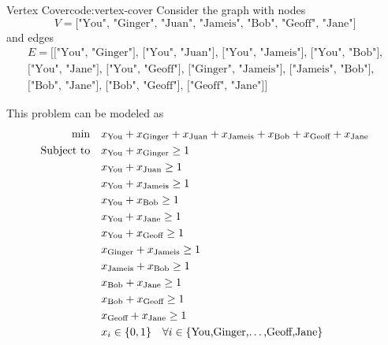 \documentclass[../open-optimization/open-optimization.tex]{subfiles}
\begin{document}
\begin{examplewithcode}{Vertex Cover}{code:vertex-cover}
\label{example:vertex-cover}
Consider the graph with nodes
\begin{equation}
V = \text{["You", "Ginger", "Juan", "Jameis", "Bob", "Geoff", "Jane"]}
\end{equation}
and edges
\begin{align}E = \text{[["You", "Ginger"],
     ["You", "Juan"], 
     ["You", "Jameis"],
     ["You", "Bob"],}\\
     \text{["You", "Jane"],
     ["You", "Geoff"],
     ["Ginger", "Jameis"],
     ["Jameis", "Bob"],}\\
     \text{
     ["Bob", "Jane"],
     ["Bob", "Geoff"],
     ["Geoff", "Jane"]]}
  \end{align}
  
This problem can be modeled as
\begin{alignat*}{1}\min\quad & x_{\text{You}} + x_{\text{Ginger}} + x_{\text{Juan}} + x_{\text{Jameis}} + x_{\text{Bob}} + x_{\text{Geoff}} + x_{\text{Jane}}\\
\text{Subject to} \quad & x_{\text{You}} + x_{\text{Ginger}} \geq 1\\
 & x_{\text{You}} + x_{\text{Juan}} \geq 1\\
 & x_{\text{You}} + x_{\text{Jameis}} \geq 1\\
 & x_{\text{You}} + x_{\text{Bob}} \geq 1\\
 & x_{\text{You}} + x_{\text{Jane}} \geq 1\\
 & x_{\text{You}} + x_{\text{Geoff}} \geq 1\\
 & x_{\text{Ginger}} + x_{\text{Jameis}} \geq 1\\
 & x_{\text{Jameis}} + x_{\text{Bob}} \geq 1\\
 & x_{\text{Bob}} + x_{\text{Jane}} \geq 1\\
 & x_{\text{Bob}} + x_{\text{Geoff}} \geq 1\\
 & x_{\text{Geoff}} + x_{\text{Jane}} \geq 1\\
 & x_{i} \in \{0,1\} \quad\forall i \in \{\text{You,Ginger,\dots,Geoff,Jane}\}\\
\end{alignat*}
\end{examplewithcode}





\end{document}
